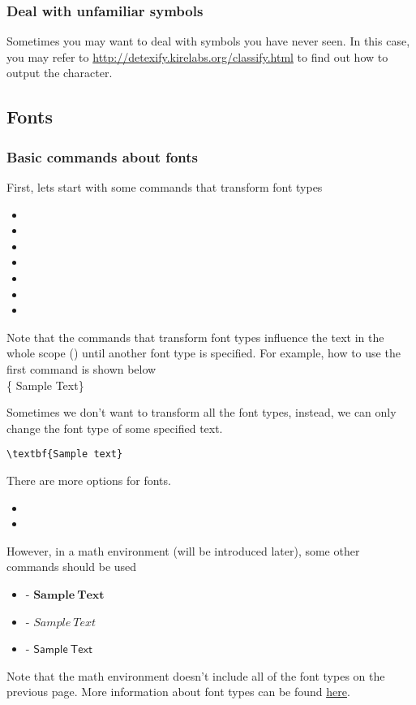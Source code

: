 \begin{frame}
	\frametitle{Deal with unfamiliar symbols}
	Sometimes you may want to deal with symbols you have never seen. In this case, you may refer to \url{http://detexify.kirelabs.org/classify.html} to find out how to output the character.
\end{frame}

\subsection{Fonts}

\begin{frame}
	\frametitle{Basic commands about fonts}
	First, lets start with some commands that transform font types
	\begin{itemize}
		\item {}
		\item {}
		\item {}
		\item {}
		\item {}
		\item {}
		\item {}
	\end{itemize}
	Note that the commands that transform font types influence the text in the whole scope () until another font type is specified. For example, how to use the first command  is shown below\\[0.5em]
	\{ Sample Text\}
\end{frame}

\begin{frame}[fragile]
	Sometimes we don't want to transform  all the font types, instead, we can only change the font type of some specified text.
	\begin{example}
		\begin{verbatim}
\textbf{Sample text}
		\end{verbatim}
	\end{example}
	There are more options for fonts.
	\begin{itemize}
		\item {}
		\item {}
	\end{itemize}
	However, in a math environment (will be introduced later), some other commands should be used
	\begin{itemize}
		\item {} - $\mathbf{Sample\ Text}$
		\item {} - $\mathit{Sample\ Text}$
		\item {} - $\mathsf{Sample\ Text}$
	\end{itemize}
	Note that the math environment doesn't include all of the font types on the previous page. More information about font types can be found \href{http://www.cnblogs.com/make217/p/6123532.html}{\color{blue}\underline{here}}.
\end{frame}

